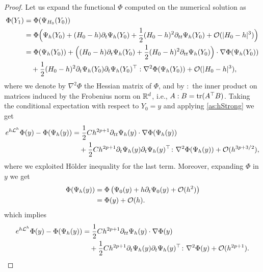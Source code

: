 \documentclass[10pt]{article}
\begin{document}
\begin{proof} Let us expand the functional $\Phi$ computed on the numerical solution as
	\begin{equation}
		\begin{aligned}
			\Phi(Y_1) &= \Phi(\Psi_{H_0}(Y_0)) \\
			&= \Phi\Big(\Psi_h(Y_0) + (H_0-h)\partial_t\Psi_h(Y_0) + \frac{1}{2}(H_0-h)^2\partial_{tt}\Psi_h(Y_0) + \mathcal{O}(\lvert H_0 - h\rvert^3)\Big)\\
			&= \Phi(\Psi_h(Y_0)) + \Big((H_0 - h)\partial_t\Psi_h(Y_0)+\frac{1}{2}(H_0-h)^2\partial_{tt}\Psi_h(Y_0)\Big) \cdot \nabla\Phi(\Psi_h(Y_0))\\
			&\quad + \frac{1}{2}(H_0 - h)^2 \partial_t \Psi_h(Y_0) \partial_t \Psi_h(Y_0)^\top : \nabla^2\Phi(\Psi_h(Y_0)) + \mathcal{O}(\lvert H_0 - h\rvert^3),
		\end{aligned}
	\end{equation}
	where we denote by $\nabla^2\Phi$ the Hessian matrix of $\Phi$, and by $:$ the inner product on matrices induced by the Frobenius norm on $\mathbb{R}^d$, i.e., $A : B = \operatorname{tr}(A^\top B)$. Taking the conditional expectation with respect to $Y_0 = y$ and applying \cref{as:hStrong} we get
	\begin{equation}
		\begin{aligned}
			e^{h\mathcal{L}^h}\Phi(y) - \Phi(\Psi_h(y)) &= \frac{1}{2} Ch^{2p+1}\partial_{tt}\Psi_h(y)\cdot \nabla\Phi(\Psi_h(y))\\
			&\quad + \frac{1}{2} Ch^{2p+1}\partial_t \Psi_h(y) \partial_t \Psi_h(y)^\top  \colon \nabla^2\Phi(\Psi_h(y)) + \mathcal{O}(h^{3p+3/2}),
		\end{aligned}
	\end{equation}
	where we exploited Hölder inequality for the last term. Moreover, expanding $\Phi$ in $y$ we get
	\begin{equation}
		\begin{aligned}
			\Phi(\Psi_h(y)) &= \Phi\left(\Psi_0(y) + h\partial_t \Psi_0(y) + \mathcal{O}(h^2)\right) \\
			&= \Phi(y) + \mathcal{O}(h).
		\end{aligned}
	\end{equation}
	which implies
	\begin{equation}\label{eq:DistanceProbDet}
		\begin{aligned}
			e^{h\diffL^h}\Phi(y) - \Phi(\Psi_h(y)) &= \frac{1}{2} Ch^{2p+1}\partial_{tt}\Psi_h(y) \cdot \nabla\Phi(y)\\
			&\quad +\frac{1}{2}Ch^{2p+1}\partial_t \Psi_h(y) \partial_t \Psi_h(y)^\top  \colon \nabla^2\Phi(y) + \OO(h^{2p+1}).

\end{aligned}
\end{equation}
\end{proof}
\end{document}
